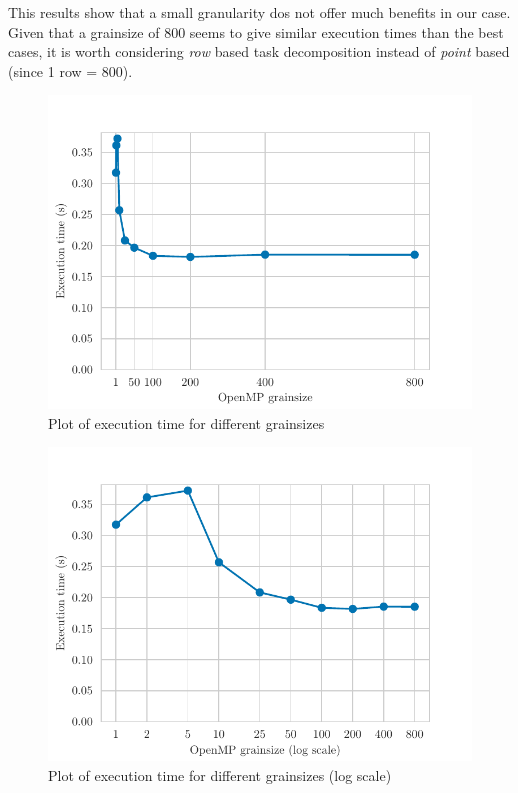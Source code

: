 This results show that a small granularity dos not offer much benefits in our case. Given that a grainsize of 800
seems to give similar execution times than the best cases, it is worth considering \emph{row} based task decomposition
instead of \emph{point} based (since 1 row = 800).

\begin{figure}[H]
    \centering
    \includegraphics{plots/grainsize.pdf}
    \caption{Plot of execution time for different grainsizes}
    \label{fig:grain} 
\end{figure}

\begin{figure}[H]
    \centering
    \includegraphics{plots/grainsize_log.pdf}
    \caption{Plot of execution time for different grainsizes (log scale)}
    \label{fig:grain_log} 
\end{figure}

